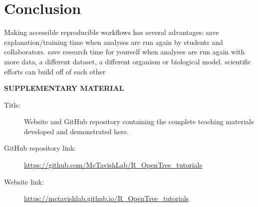 \documentclass[12pt]{article}
\begin{document}
\section{Conclusion}
\label{sec:conc}

Making accessible reproducible workflows has several advantages:
save explanation/training time when analyses are run again by students and collaborators.
save research time for yourself when analyses are run again with more data, a different dataset, a different organism or biological model.
scientific efforts can build off of each other

\bigskip
\begin{center}
{\large\bf SUPPLEMENTARY MATERIAL}
\end{center}

\begin{description}

\item[Title:] Website and GitHub repository containing the complete teaching materials developed and demonstrated here.

\item[GitHub repository link:] \url{https://github.com/McTavishLab/R_OpenTree_tutorials}

\item[Website link:] \url{https://mctavishlab.github.io/R_OpenTree_tutorials}

\end{description}




\end{document}
